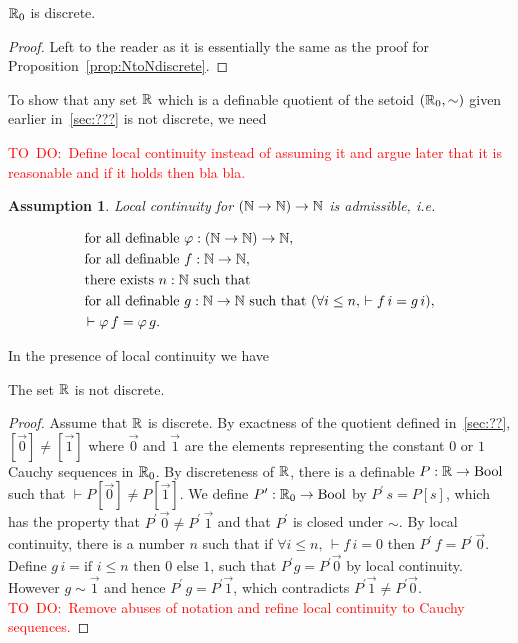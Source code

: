 \documentclass{llncs}
\newtheorem{assumption}{Assumption}%
\newcommand{\bocks}[1]{[#1]}
\newcommand{\todo}[1]{\textcolor{red}{TO~DO:~#1}}
\begin{document}
\begin{proposition}
 $\mathbb{R}_0$ is discrete.
\end{proposition}
\begin{proof}
Left to the reader as it is essentially the same as the proof for Proposition~\ref{prop:NtoNdiscrete}.
\end{proof}
To show that any set $\mathbb{R}$ which is a definable quotient of the setoid $(\mathbb{R}_0,\sim)$ given earlier in~\ref{sec:???} is not discrete, we need

\todo{Define local continuity instead of assuming it and argue later that it is reasonable and if it holds then bla bla.}
\begin{assumption}
Local continuity  for $({\mathbb N} \to {\mathbb N}) \to {\mathbb N}$ is admissible, i.e.

\newcommand{\fad}{\text{for all definable }}
\begin{align*}
   &\fad \varphi : (\N \to \N) \to \N,\\
   &\fad f : \N \to \N,\\
   &\text{there exists }  n:\N\text{ such that }\\
   &\fad g : \N \to \N \text{ such that } (\forall i\leq n,\, \vdash f\,i = g\,i),\\
   &{\,\vdash \varphi\, f} = \varphi\, g.
\end{align*}
\end{assumption}

In the presence of local continuity we have 
\begin{proposition}\label{prop:Rnotdiscrete} The set $\mathbb{R}$ is not discrete.
\end{proposition}
\begin{proof}
Assume that $\mathbb{R}$ is discrete. By exactness of the quotient defined in~\ref{sec:??}, $\bocks{\vec 0} \neq \bocks{\vec 1}$ where $\vec 0$ and $\vec 1$ are the elements representing the constant $0$ or $1$ Cauchy sequences in $\mathbb{R}_0$. By discreteness of $\mathbb{R}$, there is a definable $P:\mathbb{R}\to\mathrm{Bool}$ 
such that $\vdash P\bocks{\vec 0}\neq P\bocks{\vec 1 }$. We define $P^\prime:\mathbb{R}_0\to\mathrm{Bool}$ by $P^\prime\,s = P\bocks{s}$, which has the property that $P^\prime\,\vec0\neq P^\prime\,\vec 1$ and that $P^\prime$ is closed under $\sim$. By local continuity, there is a number $n$  such that if $\forall i\leq n,\, \vdash f\,i = 0$ then $P^\prime \, f = P^\prime\,\vec 0$. Define $g\,i=\text{if } i\leq n \text{ then } 0 \text{ else } 1$, such that $P^\prime g =P^\prime \vec 0$ by local continuity. However $g \sim \vec 1$ and hence $P^\prime\,g=P^\prime \vec 1$, which contradicts $P^\prime \vec 1 \neq P^\prime \vec 0$. 
\todo{Remove abuses of notation and refine local continuity to Cauchy sequences.}
\end{proof}
\end{document}
